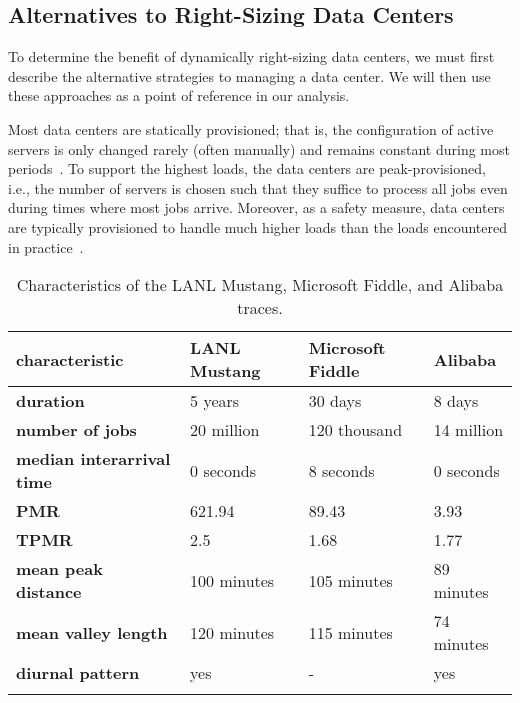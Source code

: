 \subsection{Alternatives to Right-Sizing Data Centers}\label{section:case_studies:method:alternatives}

To determine the benefit of dynamically right-sizing data centers, we must first describe the alternative strategies to managing a data center. We will then use these approaches as a point of reference in our analysis.

Most data centers are statically provisioned; that is, the configuration of active servers is only changed rarely (often manually) and remains constant during most periods~\cite{Whitney2014}. To support the highest loads, the data centers are peak-provisioned, i.e., the number of servers is chosen such that they suffice to process all jobs even during times where most jobs arrive. Moreover, as a safety measure, data centers are typically provisioned to handle much higher loads than the loads encountered in practice~\cite{Whitney2014}.

\begin{table}
    \centering
    \begin{tabularx}{\textwidth}{>{\bfseries}l|X|X|X}
        characteristic & LANL Mustang & Microsoft Fiddle & Alibaba \\\hline
        duration & 5 years & 30 days & 8 days \\
        number of jobs & 20 million & 120 thousand & 14 million \\
        median interarrival time & 0 seconds & 8 seconds & 0 seconds \\
        PMR & 621.94 & 89.43 & 3.93 \\
        TPMR & 2.5 & 1.68 & 1.77 \\
        mean peak distance & 100 minutes & 105 minutes & 89 minutes \\
        mean valley length & 120 minutes & 115 minutes & 74 minutes \\
        diurnal pattern & yes & - & yes \\
    \caption{Characteristics of the LANL Mustang, Microsoft Fiddle, and Alibaba traces.}
    \end{tabularx}
    \label{tab:traces}
\end{table}


